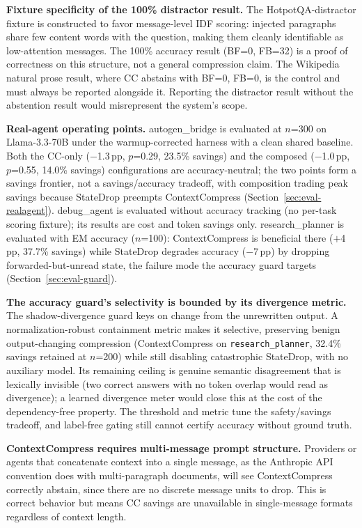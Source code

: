 \documentclass[sigconf,9pt]{acmart}
\begin{document}
\textbf{Fixture specificity of the 100\% distractor result.} The HotpotQA-distractor
fixture is constructed to favor message-level IDF scoring: injected paragraphs share
few content words with the question, making them cleanly identifiable as low-attention
messages. The 100\% accuracy result (BF=0, FB=32) is a proof of correctness on this
structure, not a general compression claim. The Wikipedia natural prose result, where
CC abstains with BF=0, FB=0, is the control and must always be reported alongside it.
Reporting the distractor result without the abstention result would misrepresent the
system's scope.

\textbf{Real-agent operating points.} autogen\_bridge is evaluated at $n$=300 on
Llama-3.3-70B under the warmup-corrected harness with a clean shared baseline. Both the
CC-only ($-$1.3\,pp, $p$=0.29, 23.5\% savings) and the composed ($-$1.0\,pp, $p$=0.55,
14.0\% savings) configurations are accuracy-neutral; the two points form a savings
frontier, not a savings/accuracy tradeoff, with composition trading peak savings because
StateDrop preempts ContextCompress (Section~\ref{sec:eval-realagent}).
debug\_agent is evaluated without accuracy tracking (no per-task scoring fixture); its
results are cost and token savings only. research\_planner is evaluated with EM accuracy
($n$=100): ContextCompress is beneficial there ($+$4\,pp, 37.7\% savings) while StateDrop
degrades accuracy ($-$7\,pp) by dropping forwarded-but-unread state, the failure mode the
accuracy guard targets (Section~\ref{sec:eval-guard}).

\textbf{The accuracy guard's selectivity is bounded by its divergence metric.} The
shadow-divergence guard keys on change from the unrewritten output. A normalization-robust
containment metric makes it selective, preserving benign output-changing compression
(ContextCompress on \texttt{research\_planner}, 32.4\% savings retained at $n$=200) while
still disabling catastrophic StateDrop, with no auxiliary model. Its remaining ceiling is
genuine semantic disagreement that is lexically invisible (two correct answers with no
token overlap would read as divergence); a learned divergence meter would close this at the
cost of the dependency-free property. The threshold and metric tune the safety/savings
tradeoff, and label-free gating still cannot certify accuracy without ground truth.

\textbf{ContextCompress requires multi-message prompt structure.} Providers or agents
that concatenate context into a single message, as the Anthropic API convention does
with multi-paragraph documents, will see ContextCompress correctly abstain, since
there are no discrete message units to drop. This is correct behavior but means CC
savings are unavailable in single-message formats regardless of context length.
\end{document}

